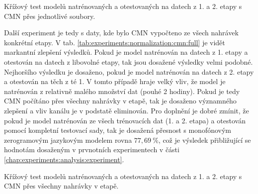 \begin{table}[htpb]
  \centering
  \def\arraystretch{1.5}
  \caption{Křížový test modelů natrénovaných a otestovaných na datech z 1. a 2. etapy s CMN přes jednotlivé soubory.}
  \label{tab:experiments:normalization:cmn:file}
\end{table}

Další experiment je tedy s daty, kde bylo CMN vypočteno ze všech nahrávek konkrétní etapy. V tab. \ref{tab:experiments:normalization:cmn:full} je vidět markantní zlepšení výsledků. Pokud je model natrénován na datech z 1. etapy a otestován na datech z libovolné etapy, tak jsou dosažené výsledky velmi podobné. Nejhoršího výsledku je dosaženo, pokud je model natrénován na datech z 2. etapy a otestován na těch z té 1. V tomto případě hraje velký vliv, že model je natrénován z relativně malého množství dat (pouhé 2 hodiny). Pokud je tedy CMN počítáno přes všechny nahrávky v etapě, tak je dosaženo významného zlepšení a vliv kanálu je v podstatě eliminován. Pro doplnění je dobré zmínit, že pokud je model natrénován ze všech trénovacích dat (1. a 2. etapa) a otestován pomocí kompletní testovací sady, tak je dosažená přesnost s monofónovým zerogramovým jazykovým modelem rovna $77,69\ \%$, což je výsledek přibližující se hodnotám dosaženým v prvnotních experimentech v části \ref{chap:experiments:analysis:experiment}.

\begin{table}[htpb]
  \centering
  \def\arraystretch{1.5}
  \caption{Křížový test modelů natrénovaných a otestovaných na datech z 1. a 2. etapy s CMN přes všechny nahrávky v etapě.}
  \label{tab:experiments:normalization:cmn:full}
\end{table}

